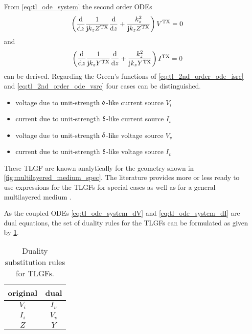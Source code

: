 From \eqref{eq:tl_ode_system} the second order \acp{ODE}
\begin{equation}\label{eq:tl_2nd_order_ode_isrc}
	\left(
		\frac{\mathrm{d}}{\mathrm{d} z}
		\frac{1}{\mathrm{j} k_z Z^{\mathrm{TX}}}
		\frac{\mathrm{d}}{\mathrm{d} z} +
		\frac{k_z^2}{\mathrm{j} k_z Z^{\mathrm{TX}}}
	\right)
	V^{\mathrm{TX}}
	=
	0
\end{equation}
and
\begin{equation}\label{eq:tl_2nd_order_ode_vsrc}
	\left(
		\frac{\mathrm{d}}{\mathrm{d} z}
		\frac{1}{\mathrm{j} k_z Y^{\mathrm{TX}}}
		\frac{\mathrm{d}}{\mathrm{d} z} +
		\frac{k_z^2}{\mathrm{j} k_z Y^{\mathrm{TX}}}
	\right)
	I^{\mathrm{TX}}
	=
	0
\end{equation}
can be derived.
Regarding the Green's functions of \eqref{eq:tl_2nd_order_ode_isrc} and
\eqref{eq:tl_2nd_order_ode_vsrc} four cases can be distinguished.
\begin{itemize}
	\item voltage due to unit-strength $\operatorname{\updelta}$-like current source $V_i$
	\item current due to unit-strength $\operatorname{\updelta}$-like current source $I_i$
	\item voltage due to unit-strength $\operatorname{\updelta}$-like voltage source $V_v$
	\item current due to unit-strength $\operatorname{\updelta}$-like voltage source $I_v$
\end{itemize}
These \ac{TLGF} are known analytically for the geometry shown in
\cref{fig:multilayered_medium_spec}.
The literature provides more or less ready to use expressions for the \acp{TLGF}
for special cases as well as for a general multilayered medium 
\cite{Michalski1990,Hsu1993,Ho1994,Eibert1997,Michalski2005}.

As the coupled \acp{ODE} \eqref{eq:tl_ode_system_dV} and
\eqref{eq:tl_ode_system_dI} are dual
equations, the set of duality rules for the \acp{TLGF} can be formulated as
given by \cref{tab:tlgf_duality}.
\begin{table}[hbt]
	\centering
	\begin{tabular}{cc}
		\toprule%
		\textbf{original} & \textbf{dual}\\ \midrule
		$V_i$ & $I_v$ \\
		$I_i$ & $V_v$ \\
		$Z$ & $Y$ \\
		\bottomrule
	\end{tabular}
	\caption{Duality substitution rules for \acp{TLGF}.}
	\label{tab:tlgf_duality}
\end{table}








